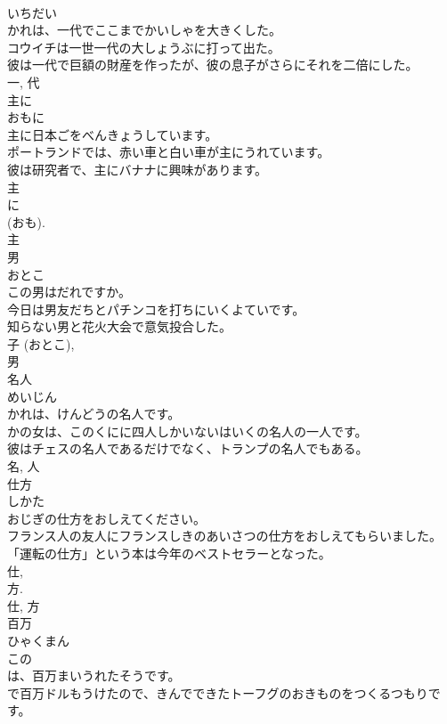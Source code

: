 \documentclass[8pt]{extreport}
\begin{document}
\begin{CJK}{UTF8}{min}
\\	いちだい	
\\	かれは、一代でここまでかいしゃを大きくした。	
\\	コウイチは一世一代の大しょうぶに打って出た。	
\\	彼は一代で巨額の財産を作ったが、彼の息子がさらにそれを二倍にした。	
\\	一, 代	
\\	主に	
\\	おもに	
\\	主に日本ごをべんきょうしています。	
\\	ポートランドでは、赤い車と白い車が主にうれています。	
\\	彼は研究者で、主にバナナに興味があります。	
\\	主 
\\	に 
\\	(おも). 
\\	主	
\\	男	
\\	おとこ	
\\	この男はだれですか。	
\\	今日は男友だちとパチンコを打ちにいくよていです。	
\\	知らない男と花火大会で意気投合した。	
\\	子 (おとこ), 
\\	男	
\\	名人	
\\	めいじん	
\\	かれは、けんどうの名人です。	
\\	かの女は、このくにに四人しかいないはいくの名人の一人です。	
\\	彼はチェスの名人であるだけでなく、トランプの名人でもある。	
\\	名, 人	
\\	仕方	
\\	しかた	
\\	おじぎの仕方をおしえてください。	
\\	フランス人の友人にフランスしきのあいさつの仕方をおしえてもらいました。	
\\	「運転の仕方」という本は今年のベストセラーとなった。	
\\	仕, 
\\	方. 
\\	仕, 方	
\\	百万	
\\	ひゃくまん	
\\	この
\\	は、百万まいうれたそうです。	
\\	で百万ドルもうけたので、きんでできたトーフグのおきものをつくるつもりです。	

\end{CJK}
\end{document}
